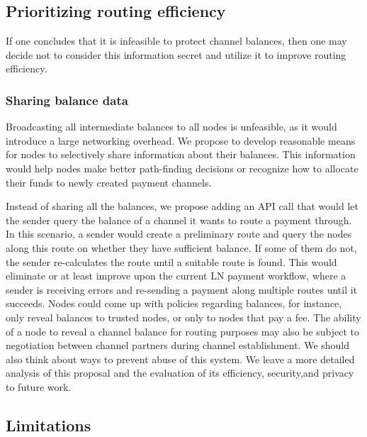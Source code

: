 \subsection{Prioritizing routing efficiency}

If one concludes that it is infeasible to protect channel balances, then one may decide not to consider this information secret and utilize it to improve routing efficiency.

\subsubsection*{Sharing balance data}

Broadcasting all intermediate balances to all nodes is unfeasible, as it would introduce a large networking overhead.
We propose to develop reasonable means for nodes to selectively share information about their balances.
This information would help nodes make better path-finding decisions or recognize how to allocate their funds to newly created payment channels.

Instead of sharing all the balances, we propose adding an API call that would let the sender query the balance of a channel it wants to route a payment through.
In this scenario, a sender would create a preliminary route and query the nodes along this route on whether they have sufficient balance.
If some of them do not, the sender re-calculates the route until a suitable route is found.
This would eliminate or at least improve upon the current LN payment workflow, where a sender is receiving errors and re-sending a payment along multiple routes until it succeeds.
Nodes could come up with policies regarding balances, for instance, only reveal balances to trusted nodes, or only to nodes that pay a fee.
The ability of a node to reveal a channel balance for routing purposes may also be subject to negotiation between channel partners during channel establishment.
We should also think about ways to prevent abuse of this system.
We leave a more detailed analysis of this proposal and the evaluation of its efficiency, security,and privacy to future work.



\subsection{Limitations}

